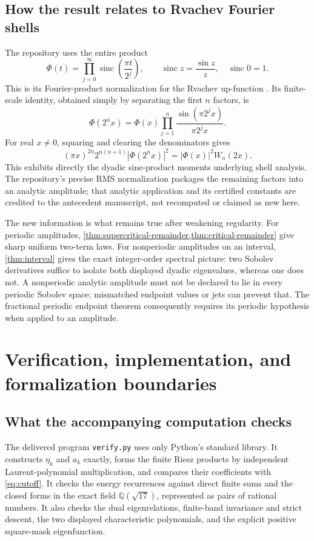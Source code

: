 \documentclass[11pt,a4paper]{article}
\theoremstyle{definition}
\theoremstyle{remark}
\newcommand{\Q}{\mathbb Q}
\newcommand{\sinc}{\operatorname{sinc}}
\numberwithin{equation}{section}
\begin{document}
\subsection{How the result relates to Rvachev Fourier shells}
The repository uses the entire product
\begin{equation}
 \Phi(t)=\prod_{j=0}^{\infty}\sinc\!\left(\frac{\pi t}{2^j}\right),
 \qquad \sinc z=\frac{\sin z}{z},\quad\sinc0=1.
 \label{eq:Phi}
\end{equation}
This is its Fourier-product normalization for the Rvachev up-function
\cite{repo-fourier,arias}. Its finite-scale identity, obtained simply
by separating the first $n$ factors, is
\begin{equation}
 \Phi(2^nx)=\Phi(x)\prod_{j=1}^n
       \frac{\sin(\pi2^jx)}{\pi2^jx}.
 \label{eq:Phi-scale}
\end{equation}
For real $x\ne0$, squaring and clearing the denominators gives
\begin{equation}
 (\pi x)^{2n}2^{n(n+1)}|\Phi(2^nx)|^2
       =|\Phi(x)|^2W_n(2x).
 \label{eq:Phi-Wn}
\end{equation}
This exhibits directly the dyadic sine-product moments underlying shell
analysis. The repository's precise RMS normalization packages the remaining
factors into an analytic amplitude; that analytic application and its
certified constants are credited to the antecedent manuscript, not
recomputed or claimed as new here.

The new information is what remains true after weakening regularity.
For periodic amplitudes, \cref{thm:supercritical-remainder,thm:critical-remainder}
give sharp uniform two-term laws. For nonperiodic amplitudes on an interval,
\cref{thm:interval} gives the exact integer-order spectral picture: two
Sobolev derivatives suffice to isolate both displayed dyadic eigenvalues,
whereas one does not. A nonperiodic analytic amplitude must not be declared
to lie in every periodic Sobolev space; mismatched endpoint values or jets
can prevent that. The fractional periodic endpoint theorem consequently
requires its periodic hypothesis when applied to an amplitude.

\section{Verification, implementation, and formalization boundaries}
\label{sec:verification}

\subsection{What the accompanying computation checks}
The delivered program \texttt{verify.py} uses only Python's standard
library. It constructs $\eta_k$ and $a_k$ exactly, forms the finite Riesz
products by independent Laurent-polynomial multiplication, and compares
their coefficients with \eqref{eq:cutoff}. It checks the energy recurrences
against direct finite sums and the closed forms in the exact field
$\Q(\sqrt{17})$, represented as pairs of rational numbers. It also checks
the dual eigenrelations, finite-band invariance and strict descent, the
two displayed characteristic polynomials, and the explicit positive
square-mask eigenfunction.
\end{document}
